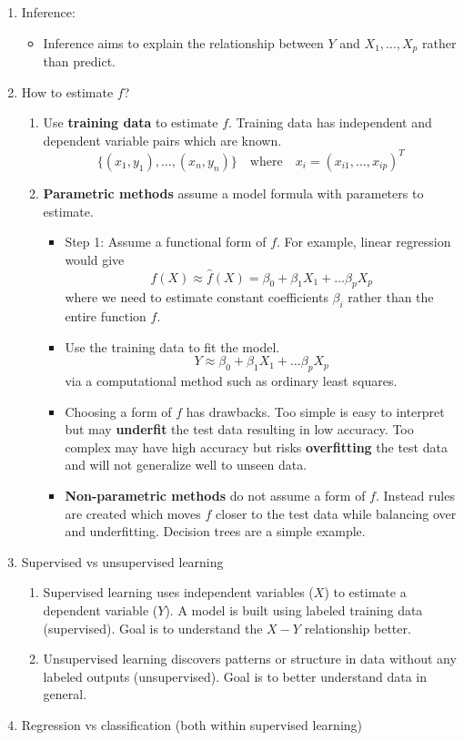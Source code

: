 \documentclass{article}
\begin{document}
\begin{enumerate}
\item Inference:
\begin{itemize}
\item Inference aims to explain the relationship between $Y$ and $X_1, \dots, X_p$ rather than predict.
\end{itemize}

\item How to estimate $f$?
\begin{enumerate}
\item Use \textbf{training data} to estimate $f$. Training data has independent and dependent variable pairs which are known.
\[
\{(x_1,y_1), \dots, (x_n,y_n) \} \quad \text{where} \quad x_i = (x_{i1},\dots,x_{ip})^T
\]

\item \textbf{Parametric methods} assume a model formula with parameters to estimate.
\begin{itemize}
\item Step 1: Assume a functional form of $f$. For example, linear regression would give
\[
f(X) \approx \hat{f}(X) = \beta_0 + \beta_1 X_1 + \dots \beta_p X_p
\]
where we need to estimate constant coefficients $\beta_i$ rather than the entire function $f$.
\item Use the training data to fit the model.
\[
Y \approx \beta_0 + \beta_1 X_1 + \dots \beta_p X_p
\]
via a computational method such as ordinary least squares. 
\item Choosing a form of $f$ has drawbacks. Too simple is easy to interpret but may \textbf{underfit} the test data resulting in low accuracy. Too complex may have high accuracy but risks \textbf{overfitting} the test data and will not generalize well to unseen data.

\item \textbf{Non-parametric methods} do not assume a form of $f$. Instead rules are created which moves $f$ closer to the test data while balancing over and underfitting. Decision trees are a simple example.
\end{itemize}

\end{enumerate}

\item Supervised vs unsupervised learning
\begin{enumerate}
\item Supervised learning uses independent variables ($X$) to estimate a dependent variable ($Y$). A model is built using labeled training data (supervised). Goal is to understand the $X-Y$ relationship better.
\item Unsupervised learning discovers patterns or structure in data without any labeled outputs (unsupervised). Goal is to better understand data in general.
\end{enumerate}

\item Regression vs classification (both within supervised learning)

\end{enumerate}
\end{document}
